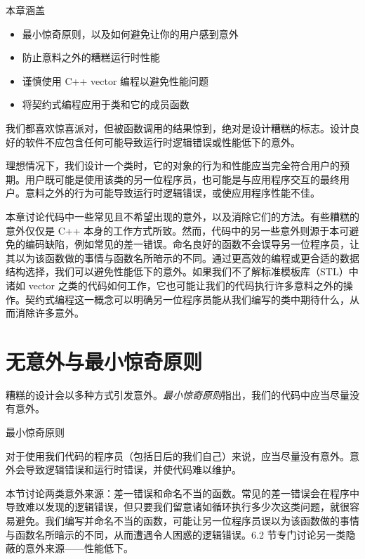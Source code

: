 \begin{myChapterIntro}{本章涵盖}
\begin{itemize}
\item 最小惊奇原则，以及如何避免让你的用户感到意外
\item 防止意料之外的糟糕运行时性能
\item 谨慎使用 C++ vector 编程以避免性能问题
\item 将契约式编程应用于类和它的成员函数
\end{itemize}
\end{myChapterIntro}

我们都喜欢惊喜派对，但被函数调用的结果惊到，绝对是设计糟糕的标志。设计良好的软件不应包含任何可能导致运行时逻辑错误或性能低下的意外。

理想情况下，我们设计一个类时，它的对象的行为和性能应当完全符合用户的预期。用户既可能是使用该类的另一位程序员，也可能是与应用程序交互的最终用户。意料之外的行为可能导致运行时逻辑错误，或使应用程序性能不佳。


本章讨论代码中一些常见且不希望出现的意外，以及消除它们的方法。有些糟糕的意外仅仅是 C++ 本身的工作方式所致。然而，代码中的另一些意外则源于本可避免的编码缺陷，例如常见的差一错误。命名良好的函数不会误导另一位程序员，让其以为该函数做的事情与函数名所暗示的不同。通过更高效的编程或更合适的数据结构选择，我们可以避免性能低下的意外。如果我们不了解标准模板库（STL）中诸如 vector 之类的代码如何工作，它也可能让我们的代码执行许多意料之外的操作。契约式编程这一概念可以明确另一位程序员能从我们编写的类中期待什么，从而消除许多意外。

\section{无意外与最小惊奇原则}

糟糕的设计会以多种方式引发意外。\emph{最小惊奇原则}指出，我们的代码中应当尽量没有意外。

\begin{mySidebar}{最小惊奇原则}

对于使用我们代码的程序员（包括日后的我们自己）来说，应当尽量没有意外。意外会导致逻辑错误和运行时错误，并使代码难以维护。
\end{mySidebar}

本节讨论两类意外来源：差一错误和命名不当的函数。常见的差一错误会在程序中导致难以发现的逻辑错误，但只要我们留意诸如循环执行多少次这类问题，就很容易避免。我们编写并命名不当的函数，可能让另一位程序员误以为该函数做的事情与函数名所暗示的不同，从而遭遇令人困惑的逻辑错误。6.2 节专门讨论另一类隐蔽的意外来源——性能低下。

